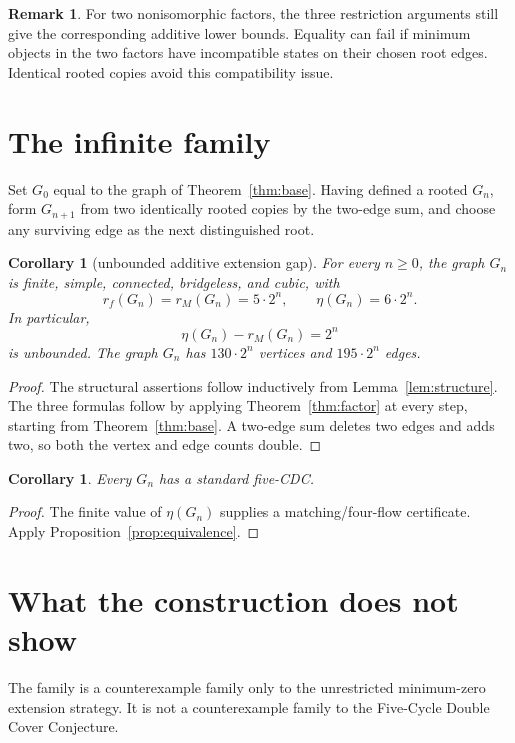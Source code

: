 \documentclass[11pt]{article}
\newtheorem{corollary}[theorem]{Corollary}
\theoremstyle{definition}
\newtheorem{remark}[theorem]{Remark}
\newcommand{\etaext}{\eta}
\begin{document}
\begin{remark}
For two nonisomorphic factors, the three restriction arguments still give
the corresponding additive lower bounds.  Equality can fail if minimum
objects in the two factors have incompatible states on their chosen root
edges.  Identical rooted copies avoid this compatibility issue.
\end{remark}

\section{The infinite family}

Set \(G_0\) equal to the graph of Theorem~\ref{thm:base}.  Having defined
a rooted \(G_n\), form \(G_{n+1}\) from two identically rooted copies by
the two-edge sum, and choose any surviving edge as the next distinguished
root.

\begin{corollary}[unbounded additive extension gap]
\label{cor:family}
For every \(n\ge0\), the graph \(G_n\) is finite, simple, connected,
bridgeless, and cubic, with
\[
\boxed{
 r_f(G_n)=r_M(G_n)=5\cdot2^n,\qquad
 \etaext(G_n)=6\cdot2^n.
}
\]
In particular,
\[
 \etaext(G_n)-r_M(G_n)=2^n
\]
is unbounded.  The graph \(G_n\) has \(130\cdot2^n\) vertices and
\(195\cdot2^n\) edges.
\end{corollary}

\begin{proof}
The structural assertions follow inductively from
Lemma~\ref{lem:structure}.  The three formulas follow by applying
Theorem~\ref{thm:factor} at every step, starting from
Theorem~\ref{thm:base}.  A two-edge sum deletes two edges and adds two, so
both the vertex and edge counts double.
\end{proof}

\begin{corollary}
Every \(G_n\) has a standard five-CDC.
\end{corollary}

\begin{proof}
The finite value of \(\etaext(G_n)\) supplies a matching/four-flow
certificate.  Apply Proposition~\ref{prop:equivalence}.
\end{proof}

\section{What the construction does not show}

The family is a counterexample family only to the unrestricted
minimum-zero extension strategy.  It is not a counterexample family to
the Five-Cycle Double Cover Conjecture.
\end{document}
